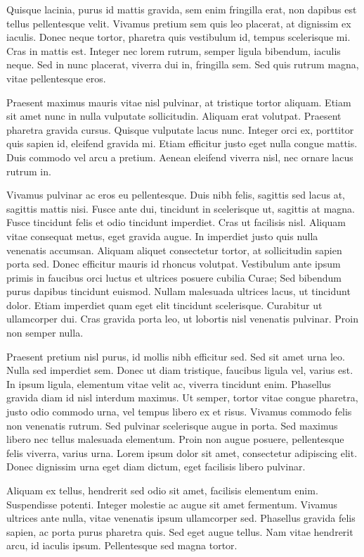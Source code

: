\documentclass[12pt, a4paper, twocolumn]{article} %
\begin{document}
Quisque lacinia, purus id mattis gravida, sem enim fringilla erat, non dapibus est tellus pellentesque velit. Vivamus pretium sem quis leo placerat, at dignissim ex iaculis. Donec neque tortor, pharetra quis vestibulum id, tempus scelerisque mi. Cras in mattis est. Integer nec lorem rutrum, semper ligula bibendum, iaculis neque. Sed in nunc placerat, viverra dui in, fringilla sem. Sed quis rutrum magna, vitae pellentesque eros.

Praesent maximus mauris vitae nisl pulvinar, at tristique tortor aliquam. Etiam sit amet nunc in nulla vulputate sollicitudin. Aliquam erat volutpat. Praesent pharetra gravida cursus. Quisque vulputate lacus nunc. Integer orci ex, porttitor quis sapien id, eleifend gravida mi. Etiam efficitur justo eget nulla congue mattis. Duis commodo vel arcu a pretium. Aenean eleifend viverra nisl, nec ornare lacus rutrum in.

Vivamus pulvinar ac eros eu pellentesque. Duis nibh felis, sagittis sed lacus at, sagittis mattis nisi. Fusce ante dui, tincidunt in scelerisque ut, sagittis at magna. Fusce tincidunt felis et odio tincidunt imperdiet. Cras ut facilisis nisl. Aliquam vitae consequat metus, eget gravida augue. In imperdiet justo quis nulla venenatis accumsan. Aliquam aliquet consectetur tortor, at sollicitudin sapien porta sed. Donec efficitur mauris id rhoncus volutpat. Vestibulum ante ipsum primis in faucibus orci luctus et ultrices posuere cubilia Curae; Sed bibendum purus dapibus tincidunt euismod. Nullam malesuada ultrices lacus, ut tincidunt dolor. Etiam imperdiet quam eget elit tincidunt scelerisque. Curabitur ut ullamcorper dui. Cras gravida porta leo, ut lobortis nisl venenatis pulvinar. Proin non semper nulla.

Praesent pretium nisl purus, id mollis nibh efficitur sed. Sed sit amet urna leo. Nulla sed imperdiet sem. Donec ut diam tristique, faucibus ligula vel, varius est. In ipsum ligula, elementum vitae velit ac, viverra tincidunt enim. Phasellus gravida diam id nisl interdum maximus. Ut semper, tortor vitae congue pharetra, justo odio commodo urna, vel tempus libero ex et risus. Vivamus commodo felis non venenatis rutrum. Sed pulvinar scelerisque augue in porta. Sed maximus libero nec tellus malesuada elementum. Proin non augue posuere, pellentesque felis viverra, varius urna. Lorem ipsum dolor sit amet, consectetur adipiscing elit. Donec dignissim urna eget diam dictum, eget facilisis libero pulvinar.

Aliquam ex tellus, hendrerit sed odio sit amet, facilisis elementum enim. Suspendisse potenti. Integer molestie ac augue sit amet fermentum. Vivamus ultrices ante nulla, vitae venenatis ipsum ullamcorper sed. Phasellus gravida felis sapien, ac porta purus pharetra quis. Sed eget augue tellus. Nam vitae hendrerit arcu, id iaculis ipsum. Pellentesque sed magna tortor.
\end{document}
